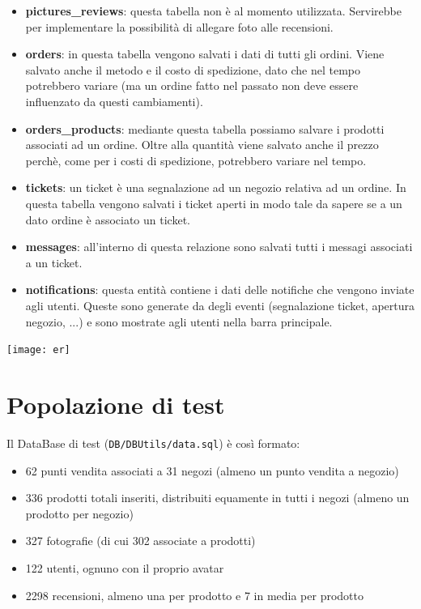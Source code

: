 \begin{itemize}
  \item \textbf{pictures\_reviews}: questa tabella non è al momento utilizzata. Servirebbe per implementare la possibilità di allegare foto  alle recensioni.
  \item \textbf{orders}: in questa tabella vengono salvati i dati di tutti gli ordini. Viene salvato anche il metodo e il costo di spedizione, dato che nel tempo potrebbero variare (ma un ordine fatto nel passato non deve essere influenzato da questi cambiamenti).
  \item \textbf{orders\_products}: mediante questa tabella possiamo salvare i prodotti associati ad un ordine. Oltre alla quantità viene salvato anche il prezzo perchè, come per i costi di spedizione, potrebbero variare nel tempo.
  \item \textbf{tickets}: un ticket è una segnalazione ad un negozio relativa ad un ordine. In questa tabella vengono salvati i ticket aperti in modo tale da sapere se a un dato ordine è associato un ticket.
  \item \textbf{messages}: all'interno di questa relazione sono salvati tutti i messagi associati a un ticket.
  \item \textbf{notifications}: questa entità contiene i dati delle notifiche che vengono inviate agli utenti. Queste sono generate da degli eventi (segnalazione ticket, apertura negozio, ...) e sono mostrate agli utenti nella barra principale.
\end{itemize}

\begin{center}
\texttt{[image: er]}
\end{center}


\section{Popolazione di test}
Il DataBase di test (\texttt{DB/DBUtils/data.sql}) è così formato:
\begin{itemize}

  \item 62 punti vendita associati a 31 negozi (almeno un punto vendita a negozio)
  \item 336 prodotti totali inseriti, distribuiti equamente in tutti i negozi (almeno un prodotto per negozio)
  \item 327 fotografie (di cui 302 associate a prodotti)
  \item 122 utenti, ognuno con il proprio avatar
  \item 2298 recensioni, almeno una per prodotto e 7 in media per prodotto

\end{itemize}

